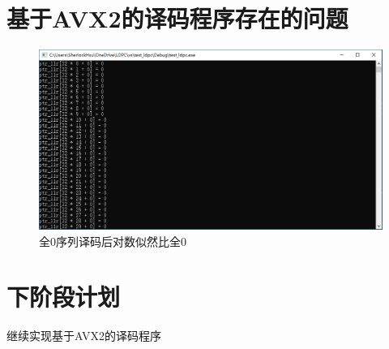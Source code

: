 \documentclass{article}
\begin{document}
\section{基于AVX2的译码程序存在的问题}
\begin{figure}[H]
	\centering
	\includegraphics[width = .8\textwidth]{err.png}
	\caption{全0序列译码后对数似然比全0}
\end{figure}



\section{下阶段计划}
继续实现基于AVX2的译码程序
\end{document}
